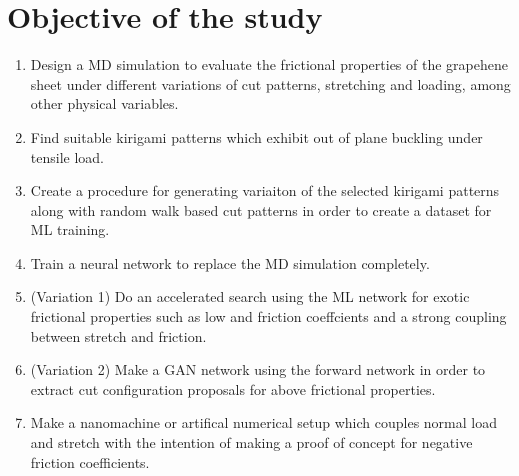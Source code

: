 

%
\section{Objective of the study}

\begin{enumerate}
    \item Design a MD simulation to evaluate the frictional properties of the
    grapehene sheet under different variations of cut patterns, stretching and
    loading, among other physical variables.
    \item Find suitable kirigami patterns which exhibit out of plane buckling under tensile load.
    \item Create a procedure for generating variaiton of the selected kirigami patterns along with random walk based cut patterns in order to create a dataset for ML training. 
    \item Train a neural network to replace the MD simulation completely.
    \item (Variation 1) Do an accelerated search using the ML network for exotic
    frictional properties such as low and friction coeffcients and a strong
    coupling between stretch and friction. 
    \item (Variation 2) Make a GAN network using the forward network in order to extract cut configuration proposals for above frictional properties.
    \item Make a nanomachine or artifical numerical setup which couples normal load and stretch with the intention of making a proof of concept for negative friction coefficients. 
\end{enumerate}


